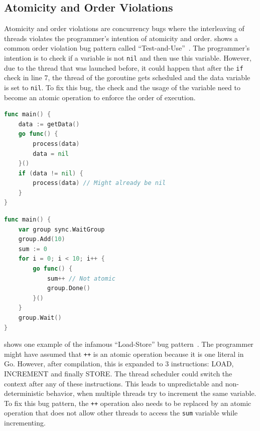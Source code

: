 \documentclass[english]{lni}
\begin{document}
\subsection{Atomicity and Order Violations}

Atomicity and order violations are concurrency bugs where the interleaving of threads violates the programmer's intention of atomicity and order.
 shows a common order violation bug pattern called ``Test-and-Use''~\cite{farchi2003patterns}.
The programmer's intention is to check if a variable is not \lstinline{nil} and then use this variable.
However, due to the thread that was launched before, it could happen that after the \lstinline{if} check in line 7, the thread of the goroutine gets scheduled and the data variable is set to \lstinline{nil}.
To fix this bug, the check and the usage of the variable need to become an atomic operation to enforce the order of execution.

\begin{lstlisting}[float=h, language=Go, label=lst:order, caption=Test-and-Use bug pattern -- Order violation]
func main() {
    data := getData()
    go func() {
        process(data)
        data = nil
    }()
    if (data != nil) {
        process(data) // Might already be nil
    }
}
\end{lstlisting}

\begin{lstlisting}[float=h, language=Go, label=lst:atomicity, caption=Load-Store bug pattern -- Atomicity violation]
func main() {
    var group sync.WaitGroup
    group.Add(10)
    sum := 0
    for i = 0; i < 10; i++ {
        go func() {
            sum++ // Not atomic
            group.Done()
        }()
    }
    group.Wait()
}
\end{lstlisting}

 shows one example of the infamous ``Load-Store'' bug pattern~\cite{farchi2003patterns}.
The programmer might have assumed that \lstinline{++} is an atomic operation because it is one literal in Go.
However, after compilation, this is expanded to 3 instructions: LOAD, INCREMENT and finally STORE.
The thread scheduler could switch the context after any of these instructions.
This leads to unpredictable and non-deterministic behavior, when multiple threads try to increment the same variable.
To fix this bug pattern, the \lstinline{++} operation also needs to be replaced by an atomic operation that does not allow other threads to access the \lstinline{sum} variable while incrementing.
\end{document}

